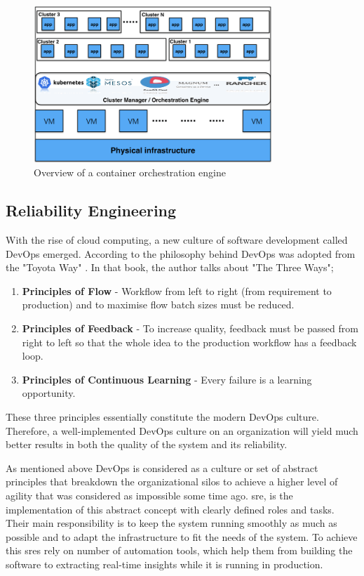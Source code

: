 \begin{figure}[H]
    \includegraphics[width=9cm]{assets/literature-review/Container-orchestration-engines.png}
    \caption{Overview of a container orchestration engine \citep{ElasticityCloudComputing}}
\end{figure}


\subsection{Reliability Engineering}

With the rise of cloud computing, a new culture of software development called DevOps emerged. According to \cite{kim2014phoenix} the philosophy behind DevOps was adopted from the "Toyota Way" \citep{liker2006toyota}. In that book, the author talks about "The Three Ways";
\begin{enumerate}
\item \textbf{Principles of Flow} - Workflow from left to right (from requirement to production) and to maximise flow batch sizes must be reduced.
\item \textbf{Principles of Feedback} - To increase quality, feedback must be passed from right to left so that the whole idea to the production workflow has a feedback loop. 
\item \textbf{Principles of Continuous Learning} - Every failure is a learning opportunity.
\end{enumerate}
These three principles essentially constitute the modern DevOps culture. Therefore, a well-implemented DevOps culture on an organization will yield much better results in both the quality of the system and its reliability. 

As mentioned above DevOps is considered as a culture or set of abstract principles that breakdown the organizational silos to achieve a higher level of agility that was considered as impossible some time ago. \ac{sre}, is the implementation of this abstract concept with clearly defined roles and tasks. Their main responsibility is to keep the system running smoothly as much as possible and to adapt the infrastructure to fit the needs of the system. To achieve this \acp{sre} rely on number of automation tools, which help them from building the software to extracting real-time insights while it is running in production.


